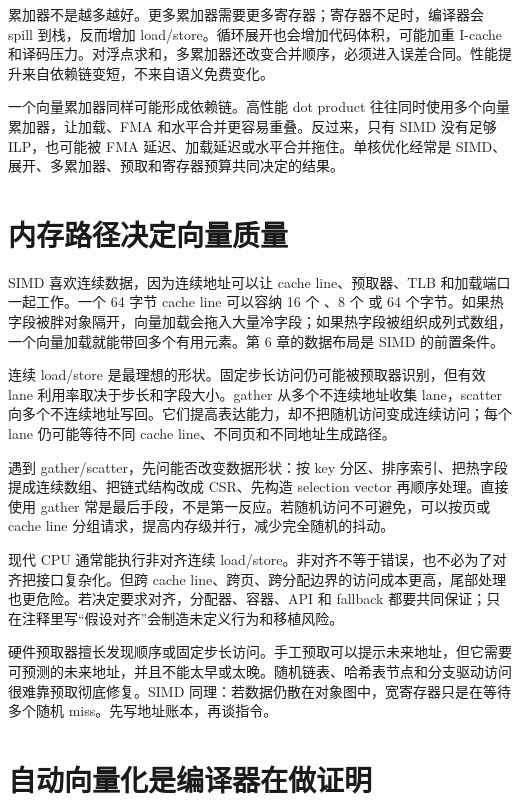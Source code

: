 累加器不是越多越好。更多累加器需要更多寄存器；寄存器不足时，编译器会 spill 到栈，反而增加 load/store。循环展开也会增加代码体积，可能加重 I-cache 和译码压力。对浮点求和，多累加器还改变合并顺序，必须进入误差合同。性能提升来自依赖链变短，不来自语义免费变化。

一个向量累加器同样可能形成依赖链。高性能 dot product 往往同时使用多个向量累加器，让加载、FMA 和水平合并更容易重叠。反过来，只有 SIMD 没有足够 ILP，也可能被 FMA 延迟、加载延迟或水平合并拖住。单核优化经常是 SIMD、展开、多累加器、预取和寄存器预算共同决定的结果。

\section{内存路径决定向量质量}

SIMD 喜欢连续数据，因为连续地址可以让 cache line、预取器、TLB 和加载端口一起工作。一个 64 字节 cache line 可以容纳 16 个 、8 个  或 64 个字节。如果热字段被胖对象隔开，向量加载会拖入大量冷字段；如果热字段被组织成列式数组，一个向量加载就能带回多个有用元素。第 6 章的数据布局是 SIMD 的前置条件。

连续 load/store 是最理想的形状。固定步长访问仍可能被预取器识别，但有效 lane 利用率取决于步长和字段大小。gather 从多个不连续地址收集 lane，scatter 向多个不连续地址写回。它们提高表达能力，却不把随机访问变成连续访问；每个 lane 仍可能等待不同 cache line、不同页和不同地址生成路径。

遇到 gather/scatter，先问能否改变数据形状：按 key 分区、排序索引、把热字段提成连续数组、把链式结构改成 CSR、先构造 selection vector 再顺序处理。直接使用 gather 常是最后手段，不是第一反应。若随机访问不可避免，可以按页或 cache line 分组请求，提高内存级并行，减少完全随机的抖动。

现代 CPU 通常能执行非对齐连续 load/store。非对齐不等于错误，也不必为了对齐把接口复杂化。但跨 cache line、跨页、跨分配边界的访问成本更高，尾部处理也更危险。若决定要求对齐，分配器、容器、API 和 fallback 都要共同保证；只在注释里写“假设对齐”会制造未定义行为和移植风险。

硬件预取器擅长发现顺序或固定步长访问。手工预取可以提示未来地址，但它需要可预测的未来地址，并且不能太早或太晚。随机链表、哈希表节点和分支驱动访问很难靠预取彻底修复。SIMD 同理：若数据仍散在对象图中，宽寄存器只是在等待多个随机 miss。先写地址账本，再谈指令。

\section{自动向量化是编译器在做证明}

